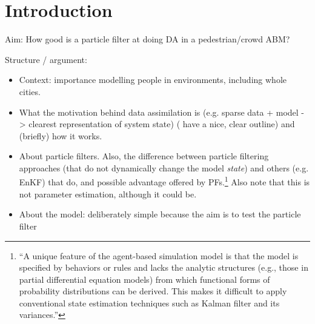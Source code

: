 \section{Introduction\label{introduction}}

Aim: How good is a particle filter at doing DA in a pedestrian/crowd ABM?

Structure / argument:
\begin{itemize}
\item Context: importance modelling people in environments, including whole cities.
\item What the motivation behind data assimilation is (e.g. sparse data + model -> clearest representation of system state) (\citet{wang_data_2015} have a nice, clear outline) and (briefly) how it works.
\item About particle filters. Also, the difference between particle filtering approaches (that do not dynamically change the model \textit{state}) and others (e.g. EnKF) that do, and possible advantage offered by PFs.\footnote{``A unique feature of the agent-based simulation model is that the model is specified by behaviors or rules and lacks the analytic structures (e.g., those in partial differential equation models) from which functional forms of probability distributions can be derived. This makes it difficult to apply conventional state estimation techniques such as Kalman filter and its variances.''\citep{wang_data_2015} } Also note that this is not parameter estimation, although it could be.
\item About the model: deliberately simple because the aim is to test the particle filter
\end{itemize}
